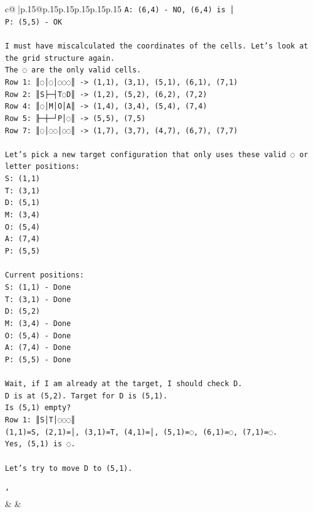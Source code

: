 \documentclass{article}
\begin{document}
{\begin{supertabular}{c@{$\;$}|p{.15\linewidth}@{}p{.15\linewidth}p{.15\linewidth}p{.15\linewidth}p{.15\linewidth}p{.15\linewidth}}
{{{\texttt{A: (6,4) {-} NO, (6,4) is │} \\
\texttt{P: (5,5) {-} OK} \\
\\ 
\texttt{I must have miscalculated the coordinates of the cells. Let's look at the grid structure again.} \\
\texttt{The ◌ are the only valid cells.} \\
\texttt{Row 1: ║◌│◌│◌◌◌║ {-}> (1,1), (3,1), (5,1), (6,1), (7,1)} \\
\texttt{Row 2: ║S├─┤T◌D║ {-}> (1,2), (5,2), (6,2), (7,2)} \\
\texttt{Row 4: ║◌│M│O│A║ {-}> (1,4), (3,4), (5,4), (7,4)} \\
\texttt{Row 5: ╟─┼─┘P│◌║ {-}> (5,5), (7,5)} \\
\texttt{Row 7: ║◌│◌◌│◌◌║ {-}> (1,7), (3,7), (4,7), (6,7), (7,7)} \\
\\ 
\texttt{Let's pick a new target configuration that only uses these valid ◌ or letter positions:} \\
\texttt{S: (1,1)} \\
\texttt{T: (3,1)} \\
\texttt{D: (5,1)} \\
\texttt{M: (3,4)} \\
\texttt{O: (5,4)} \\
\texttt{A: (7,4)} \\
\texttt{P: (5,5)} \\
\\ 
\texttt{Current positions:} \\
\texttt{S: (1,1) {-} Done} \\
\texttt{T: (3,1) {-} Done} \\
\texttt{D: (5,2)} \\
\texttt{M: (3,4) {-} Done} \\
\texttt{O: (5,4) {-} Done} \\
\texttt{A: (7,4) {-} Done} \\
\texttt{P: (5,5) {-} Done} \\
\\ 
\texttt{Wait, if I am already at the target, I should check D.} \\
\texttt{D is at (5,2). Target for D is (5,1).} \\
\texttt{Is (5,1) empty?} \\
\texttt{Row 1: ║S│T│◌◌◌║} \\
\texttt{(1,1)=S, (2,1)=│, (3,1)=T, (4,1)=│, (5,1)=◌, (6,1)=◌, (7,1)=◌.} \\
\texttt{Yes, (5,1) is ◌.} \\
\\ 
\texttt{Let's try to move D to (5,1).} \\
\\ 
\texttt{'} \\
            }
        }
    }
    & & \\ \\


\end{supertabular}}
\end{document}
